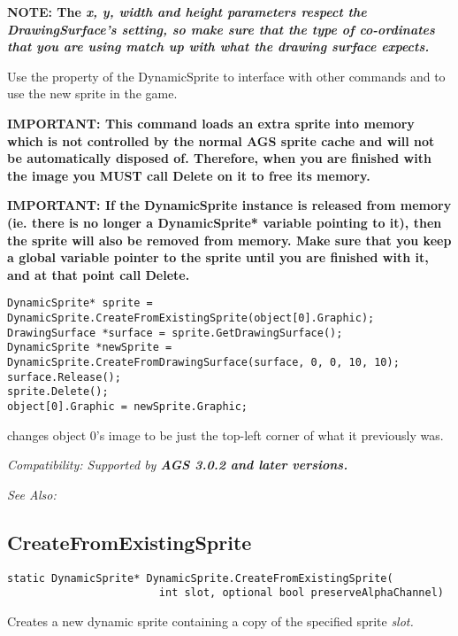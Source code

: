 \bf{NOTE:} The \it{x}, \it{y}, \it{width} and \it{height} parameters respect
the DrawingSurface's 
setting, so make sure that the type of co-ordinates that you are using match
up with what the drawing surface expects.

Use the  property of the DynamicSprite to
interface with other commands and to use the new sprite in the game.

\bf{IMPORTANT:} This command loads an extra sprite into memory which is not controlled
by the normal AGS sprite cache and will not be automatically disposed of. Therefore, when
you are finished with the image you \bf{MUST} call Delete on it to free its memory.

\bf{IMPORTANT:} If the DynamicSprite instance is released from memory (ie. there is
no longer a DynamicSprite* variable pointing to it), then the sprite will also be
removed from memory. Make sure that you keep a global variable pointer to the sprite
until you are finished with it, and at that point call Delete.

\begin{verbatim}
DynamicSprite* sprite = DynamicSprite.CreateFromExistingSprite(object[0].Graphic);
DrawingSurface *surface = sprite.GetDrawingSurface();
DynamicSprite *newSprite = DynamicSprite.CreateFromDrawingSurface(surface, 0, 0, 10, 10);
surface.Release();
sprite.Delete();
object[0].Graphic = newSprite.Graphic;
\end{verbatim}
changes object 0's image to be just the top-left corner of what it previously was.

\it{Compatibility:} Supported by \bf{AGS 3.0.2} and later versions.

\it{See Also:} 


\subsection{CreateFromExistingSprite}\label{DynamicSprite.CreateFromExistingSprite}%

\begin{verbatim}
static DynamicSprite* DynamicSprite.CreateFromExistingSprite(
                        int slot, optional bool preserveAlphaChannel)
\end{verbatim}
Creates a new dynamic sprite containing a copy of the specified sprite \it{slot}.

